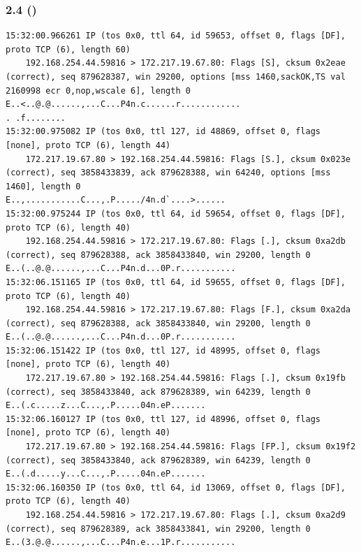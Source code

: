 \documentclass[12pt]{article}
\theoremstyle{plain}
\begin{document}
\subsubsection{2.4 ()}
\begin{lstlisting}
15:32:00.966261 IP (tos 0x0, ttl 64, id 59653, offset 0, flags [DF], proto TCP (6), length 60)
    192.168.254.44.59816 > 172.217.19.67.80: Flags [S], cksum 0x2eae (correct), seq 879628387, win 29200, options [mss 1460,sackOK,TS val 2160998 ecr 0,nop,wscale 6], length 0
E..<..@.@......,...C...P4n.c......r............
. .f........
15:32:00.975082 IP (tos 0x0, ttl 127, id 48869, offset 0, flags [none], proto TCP (6), length 44)
    172.217.19.67.80 > 192.168.254.44.59816: Flags [S.], cksum 0x023e (correct), seq 3858433839, ack 879628388, win 64240, options [mss 1460], length 0
E..,...........C...,.P...../4n.d`....>......
15:32:00.975244 IP (tos 0x0, ttl 64, id 59654, offset 0, flags [DF], proto TCP (6), length 40)
    192.168.254.44.59816 > 172.217.19.67.80: Flags [.], cksum 0xa2db (correct), seq 879628388, ack 3858433840, win 29200, length 0
E..(..@.@......,...C...P4n.d...0P.r...........
15:32:06.151165 IP (tos 0x0, ttl 64, id 59655, offset 0, flags [DF], proto TCP (6), length 40)
    192.168.254.44.59816 > 172.217.19.67.80: Flags [F.], cksum 0xa2da (correct), seq 879628388, ack 3858433840, win 29200, length 0
E..(..@.@......,...C...P4n.d...0P.r...........
15:32:06.151422 IP (tos 0x0, ttl 127, id 48995, offset 0, flags [none], proto TCP (6), length 40)
    172.217.19.67.80 > 192.168.254.44.59816: Flags [.], cksum 0x19fb (correct), seq 3858433840, ack 879628389, win 64239, length 0
E..(.c.....z...C...,.P.....04n.eP.......
15:32:06.160127 IP (tos 0x0, ttl 127, id 48996, offset 0, flags [none], proto TCP (6), length 40)
    172.217.19.67.80 > 192.168.254.44.59816: Flags [FP.], cksum 0x19f2 (correct), seq 3858433840, ack 879628389, win 64239, length 0
E..(.d.....y...C...,.P.....04n.eP.......
15:32:06.160350 IP (tos 0x0, ttl 64, id 13069, offset 0, flags [DF], proto TCP (6), length 40)
    192.168.254.44.59816 > 172.217.19.67.80: Flags [.], cksum 0xa2d9 (correct), seq 879628389, ack 3858433841, win 29200, length 0
E..(3.@.@......,...C...P4n.e...1P.r...........
\end{lstlisting}
\end{document}
